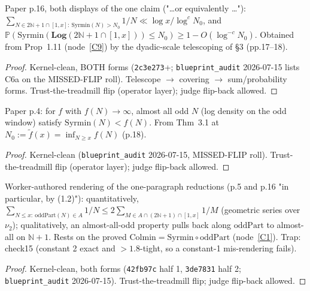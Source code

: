 \begin{theorem}\label{C6a}
  \leanok
Paper p.16, both displays of the one claim ("\dots or equivalently \dots"):
\(\sum_{N\in 2\mathbb{N}+1\cap[1,x]:\ \mathrm{Syrmin}(N)>N_0} 1/N \ll \log x/\log^c N_0\),
and \(\mathbb{P}(\mathrm{Syrmin}(\mathbf{Log}(2\mathbb{N}+1\cap[1,x]))\le N_0) \ge
1-O(\log^{-c}N_0)\).  Obtained from Prop~1.11 (node~\ref{C9}) by the dyadic-scale
telescoping of \S3 (pp.17--18).
\end{theorem}
\begin{proof}
  \leanok
  Kernel-clean, BOTH forms (\texttt{2c3e273}+; \texttt{blueprint\_audit} 2026-07-15 lists
  C6a on the MISSED-FLIP roll).  Telescope \(\to\) covering \(\to\) sum/probability forms.
  Trust-the-treadmill flip (operator layer); judge flip-back allowed.
\end{proof}

\begin{theorem}[Theorem 1.6]\label{C6b}
  \leanok
Paper p.4: for \(f\) with \(f(N)\to\infty\), almost all odd \(N\) (log density on the odd
window) satisfy \(\mathrm{Syrmin}(N)<f(N)\).  From Thm~3.1 at \(N_0:=\tilde f(x)=
\inf_{N\ge x}f(N)\) (p.18).
\end{theorem}
\begin{proof}
  \leanok
  Kernel-clean (\texttt{blueprint\_audit} 2026-07-15, MISSED-FLIP roll).  Trust-the-treadmill
  flip (operator layer); judge flip-back allowed.
\end{proof}

\begin{lemma}\label{C6c}
  \leanok
Worker-authored rendering of the one-paragraph reductions (p.5 and p.16 "in particular, by
(1.2)"): quantitatively, \(\sum_{N\le x:\ \mathrm{oddPart}(N)\in A} 1/N \le
2\sum_{M\in A\cap(2\mathbb{N}+1)\cap[1,x]} 1/M\) (geometric series over \(\nu_2\));
qualitatively, an almost-all-odd property pulls back along \(\mathrm{oddPart}\) to
almost-all on \(\mathbb{N}+1\).  Rests on the proved \(\mathrm{Colmin}=
\mathrm{Syrmin}\circ\mathrm{oddPart}\) (node~\ref{C1}).  Trap: check15 (constant 2 exact
and \(>1.8\)-tight, so a constant-1 mis-rendering fails).
\end{lemma}
\begin{proof}
  \leanok
  Kernel-clean, both forms (\texttt{42fb97c} half 1, \texttt{3de7831} half 2;
  \texttt{blueprint\_audit} 2026-07-15).  Trust-the-treadmill flip; judge flip-back allowed.
\end{proof}

